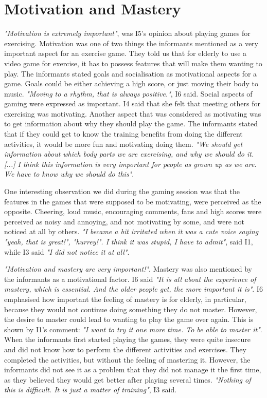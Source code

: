 \section{Motivation and Mastery}

\emph{"Motivation is extremely important"}, was I5's opinion about playing games for exercising. Motivation was one of two things the informants mentioned as a very important aspect for an exercise game. They told us that for elderly to use a video game for exercise, it has to possess features that will make them wanting to play. The informants stated goals and socialisation as motivational aspects for a game. Goals could be either achieving a high score, or just moving their body to music. \emph{"Moving to a rhythm, that is always positive."}, I6 said. Social aspects of gaming were expressed as important. I4 said that she felt that meeting others for exercising was motivating. Another aspect that was considered as motivating was to get information about why they should play the game. The informants stated that if they could get to know the training benefits from doing the different activities, it would be more fun and motivating doing them. \emph{"We should get information about which body parts we are exercising, and why we should do it. [...] I think this information is very important for people as grown up as we are. We have to know why we should do this"}. 

One interesting observation we did during the gaming session was that the features in the games that were supposed to be motivating, were perceived as the opposite. Cheering, loud music, encouraging comments, fans and high scores were perceived as noisy and annoying, and not motivating by some, and were not noticed at all by others. \emph{"I became a bit irritated when it was a cute voice saying "yeah, that is great!", "hurrey!". I think it was stupid, I have to admit"}, said I1, while I3 said \emph{"I did not notice it at all"}. 

\emph{"Motivation and mastery are very important!"}. Mastery was also mentioned by the informants as a motivational factor. I6 said \emph{"It is all about the experience of mastery, which is essential. And the older people get, the more important it is"}. I6 emphasised how important the feeling of mastery is for elderly, in particular, because they would not continue doing something they do not master. However, the desire to master could lead to wanting to play the game over again. This is shown by I1's comment: \emph{"I want to try it one more time. To be able to master it"}. When the informants first started playing the games, they were quite insecure and did not know how to perform the different activities and exercises. They completed the activities, but without the feeling of mastering it. However, the informants did not see it as a problem that they did not manage it the first time, as they believed they would get better after playing several times. \emph{"Nothing of this is difficult. It is just a matter of training"}, I3 said. 

